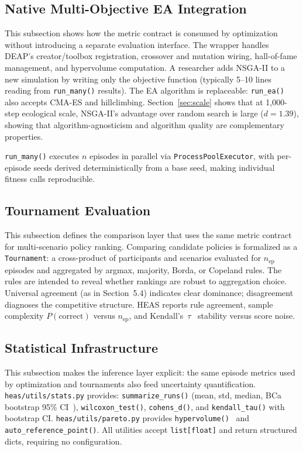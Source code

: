 \documentclass{wscpaperproc}
\begin{document}
\subsection{Native Multi-Objective EA Integration}

This subsection shows how the metric contract is consumed by optimization
without introducing a separate evaluation interface. The wrapper handles DEAP's creator/toolbox registration, crossover and mutation
wiring, hall-of-fame management, and hypervolume computation. A researcher adds
NSGA-II to a new simulation by writing only the objective function (typically
5--10 lines reading from \texttt{run\_many()} results). The EA algorithm is
replaceable: \texttt{run\_ea()} also accepts CMA-ES and hillclimbing.
Section~\ref{sec:scale} shows that at 1,000-step ecological scale, NSGA-II's
advantage over random search is large ($d\!=\!1.39$), showing that
algorithm-agnosticism and algorithm quality are complementary properties.

\texttt{run\_many()} executes $n$ episodes in parallel via
\texttt{ProcessPoolExecutor}, with per-episode seeds derived deterministically
from a base seed, making individual fitness calls reproducible.

\subsection{Tournament Evaluation}

This subsection defines the comparison layer that uses the same metric contract
for multi-scenario policy ranking. Comparing candidate policies is formalized as a \texttt{Tournament}: a
cross-product of participants and scenarios evaluated for $n_\text{ep}$
episodes and aggregated by argmax, majority, Borda, or Copeland rules. The
rules are intended to reveal whether rankings are robust to aggregation choice.
Universal agreement (as in Section~5.4) indicates clear dominance;
disagreement diagnoses the competitive structure.
HEAS reports rule agreement, sample complexity $P(\text{correct})$ versus
$n_\text{ep}$, and Kendall's~$\tau$~\cite{kendall1938new} stability versus
score noise.

\subsection{Statistical Infrastructure}

This subsection makes the inference layer explicit: the same episode metrics
used by optimization and tournaments also feed uncertainty quantification.
\texttt{heas/utils/stats.py} provides: \texttt{summarize\_runs()} (mean, std,
median, BCa bootstrap 95\% CI~\cite{efron1994bootstrap}),
\texttt{wilcoxon\_test()}, \texttt{cohens\_d()}, and \texttt{kendall\_tau()}
with bootstrap CI. \texttt{heas/utils/pareto.py} provides
\texttt{hypervolume()}~\cite{zitzler1998hypervolume} and
\texttt{auto\_reference\_point()}. All utilities accept \texttt{list[float]}
and return structured dicts, requiring no configuration.
\end{document}
